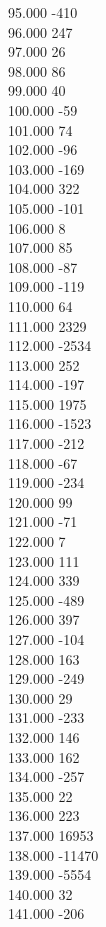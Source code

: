 { 95.000	-410 \\
 96.000	247 \\
 97.000	26 \\
 98.000	86 \\
 99.000	40 \\
 100.000	-59 \\
 101.000	74 \\
 102.000	-96 \\
 103.000	-169 \\
 104.000	322 \\
 105.000	-101 \\
 106.000	8 \\
 107.000	85 \\
 108.000	-87 \\
 109.000	-119 \\
 110.000	64 \\
 111.000	2329 \\
 112.000	-2534 \\
 113.000	252 \\
 114.000	-197 \\
 115.000	1975 \\
 116.000	-1523 \\
 117.000	-212 \\
 118.000	-67 \\
 119.000	-234 \\
 120.000	99 \\
 121.000	-71 \\
 122.000	7 \\
 123.000	111 \\
 124.000	339 \\
 125.000	-489 \\
 126.000	397 \\
 127.000	-104 \\
 128.000	163 \\
 129.000	-249 \\
 130.000	29 \\
 131.000	-233 \\
 132.000	146 \\
 133.000	162 \\
 134.000	-257 \\
 135.000	22 \\
 136.000	223 \\
 137.000	16953 \\
 138.000	-11470 \\
 139.000	-5554 \\
 140.000	32 \\
 141.000	-206 \\
}
